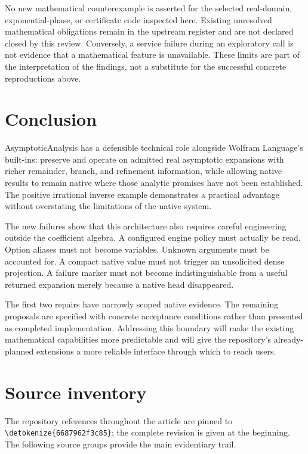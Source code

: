 \documentclass[11pt]{article}
\newcommand{\code}[1]{{\ttfamily\expandafter\nolinkurl\expandafter{\detokenize{#1}}}}
\begin{document}
No new mathematical counterexample is asserted for the selected real-domain, exponential-phase, or certificate code inspected here. Existing unresolved mathematical obligations remain in the upstream register and are not declared closed by this review. Conversely, a service failure during an exploratory call is not evidence that a mathematical feature is unavailable. These limits are part of the interpretation of the findings, not a substitute for the successful concrete reproductions above.

\section{Conclusion}
AsymptoticAnalysis has a defensible technical role alongside Wolfram Language's built-ins: preserve and operate on admitted real asymptotic expansions with richer remainder, branch, and refinement information, while allowing native results to remain native where those analytic promises have not been established. The positive irrational inverse example demonstrates a practical advantage without overstating the limitations of the native system.

The new failures show that this architecture also requires careful engineering outside the coefficient algebra. A configured engine policy must actually be read. Option aliases must not become variables. Unknown arguments must be accounted for. A compact native value must not trigger an unsolicited dense projection. A failure marker must not become indistinguishable from a useful returned expansion merely because a native head disappeared.

The first two repairs have narrowly scoped native evidence. The remaining proposals are specified with concrete acceptance conditions rather than presented as completed implementation. Addressing this boundary will make the existing mathematical capabilities more predictable and will give the repository's already-planned extensions a more reliable interface through which to reach users.

\clearpage
\appendix
\section{Source inventory}
The repository references throughout the article are pinned to \code{6687962f3c85}; the complete revision is given at the beginning. The following source groups provide the main evidentiary trail.
\end{document}
